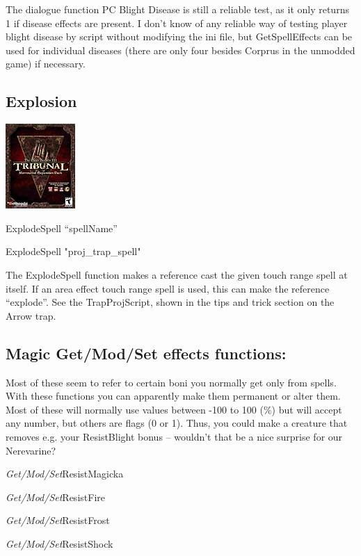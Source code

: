 \documentclass[
]{article}
\begin{document}
The dialogue function PC Blight Disease is still a reliable test, as it
only returns 1 if disease effects are present. I don't know of any
reliable way of testing player blight disease by script without
modifying the ini file, but GetSpellEffects can be used for individual
diseases (there are only four besides Corprus in the unmodded game) if
necessary.

\hypertarget{explosion}{%
\subsection{Explosion}\label{explosion}}

\includegraphics{media/image6.png}

ExplodeSpell ``spellName''

ExplodeSpell "proj\_trap\_spell"

The ExplodeSpell function makes a reference cast the given touch range
spell at itself. If an area effect touch range spell is used, this can
make the reference ``explode''. See the TrapProjScript, shown in the
tips and trick section on the Arrow trap.

\hypertarget{magic-getmodset-effects-functions}{%
\subsection{Magic Get/Mod/Set effects
functions:}\label{magic-getmodset-effects-functions}}

Most of these seem to refer to certain boni you normally get only from
spells. With these functions you can apparently make them permanent or
alter them. Most of these will normally use values between -100 to 100
(\%) but will accept any number, but others are flags (0 or 1). Thus,
you could make a creature that removes e.g. your ResistBlight bonus --
wouldn't that be a nice surprise for our Nerevarine?

\emph{Get/Mod/Set}ResistMagicka

\emph{Get/Mod/Set}ResistFire

\emph{Get/Mod/Set}ResistFrost

\emph{Get/Mod/Set}ResistShock
\end{document}
